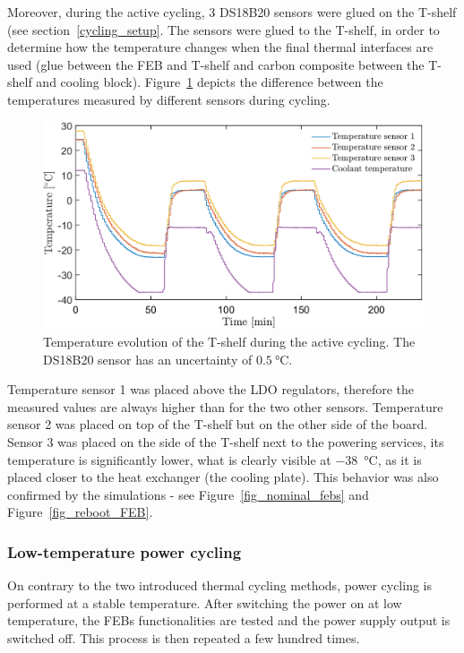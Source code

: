 Moreover, during the active cycling, 3 DS18B20 sensors were glued on the T-shelf (see section~\ref{cycling_setup}. The sensors were glued to the T-shelf, in order to determine how the temperature changes when the final thermal interfaces are used (glue between the FEB and T-shelf and carbon composite between the T-shelf and cooling block). Figure~\ref{fig_active_sensors} depicts the difference between the temperatures measured by different sensors during cycling. 

\begin{figure}[!h]
\centering
\includegraphics[width=0.75\columnwidth]{Chapter4/images/active.png}
\caption{Temperature evolution of the T-shelf during the active cycling. The DS18B20 \cite{DS18B20} sensor has an uncertainty of $\SI{0.5}{\celsius}$.}
\label{fig_active_sensors}
\end{figure}

\newpage
Temperature sensor 1 was placed above the \gls{LDO} regulators, therefore the measured values are always higher than for the two other sensors. Temperature sensor 2 was placed on top of the T-shelf but on the other side of the board. Sensor 3 was placed on the side of the T-shelf next to the powering services, its temperature is significantly lower, what is clearly visible at \SI{-38}{\celsius}, as it is placed closer to the heat exchanger (the cooling plate). This behavior was also confirmed by the simulations - see Figure~\ref{fig_nominal_febs} and Figure~\ref{fig_reboot_FEB}. 



\subsubsection{Low-temperature power cycling}
On contrary to the two introduced thermal cycling methods, power cycling is performed at a stable temperature. After switching the power on at low temperature, the \glspl{FEB} functionalities are tested and the power supply output is switched off. This process is then repeated a few hundred times. 

